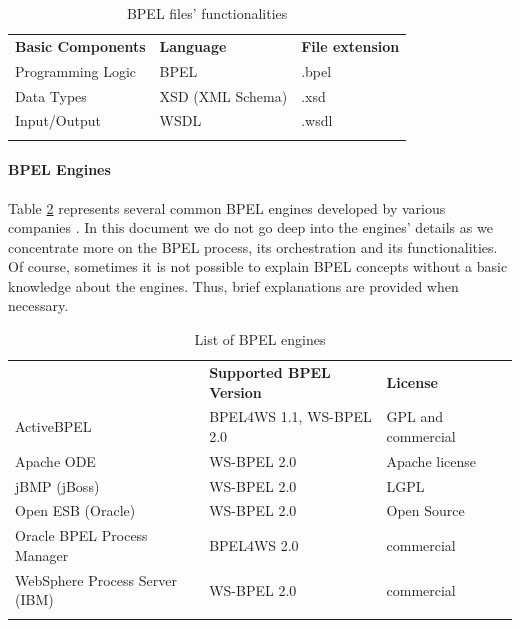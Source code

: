 \begin{table}[h!]
\caption{BPEL files' functionalities}
\label{BPELfilesTable}
\begin{center}
\begin{tabular}{l l l}
						\toprule
						\addlinespace[0.2cm]
\textbf{Basic Components} 	& \textbf{Language} 	& \textbf{File extension} 	\\ 
						\cmidrule(l){1-3}
Programming Logic 		& BPEL			& .bpel 			\\[0,1cm]
Data Types 			& XSD (XML Schema) 	& .xsd 				\\[0,1cm]
Input/Output 			& WSDL 			& .wsdl 			\\[0,1cm]
						\addlinespace[0.2cm]
						\bottomrule
\end{tabular}
\end{center}
\end{table}


\paragraph{BPEL Engines}
Table \ref{BPELengines} represents several common BPEL engines developed by various companies \cite{BPELenginesComparisonOnWikipedia}. In this document we do not go deep into the engines' details as we concentrate more on the BPEL process, its orchestration and its functionalities. Of course, sometimes it is not possible to explain BPEL concepts without a basic knowledge about the engines. Thus, brief explanations are provided when necessary.


\begin{table}
\caption{List of BPEL engines}
\label{BPELengines}
\begin{center}
\begin{tabular}{l l l}  %
						\toprule
						\addlinespace[0.2cm]
{\bf Name of BPEL Engine} 	& {\bf Supported BPEL Version} 	& {\bf License} 	\\
						\cmidrule(l){1-3}
ActiveBPEL         		& BPEL4WS 1.1, WS-BPEL 2.0 	& GPL and commercial 	\\[0,1cm]
Apache ODE         		& WS-BPEL 2.0 			& Apache license	\\[0,1cm]
jBMP (jBoss)         		& WS-BPEL 2.0 			& LGPL			\\[0,1cm]
Open ESB (Oracle)		& WS-BPEL 2.0 			& Open Source		\\[0,1cm] 
Oracle BPEL Process Manager   	& BPEL4WS 2.0 			& commercial		\\[0,1cm]
WebSphere Process Server (IBM)	& WS-BPEL 2.0			& commercial		\\[0,1cm]
						\addlinespace[0.2cm]
						\bottomrule
\end{tabular}
\end{center}
\end{table}
